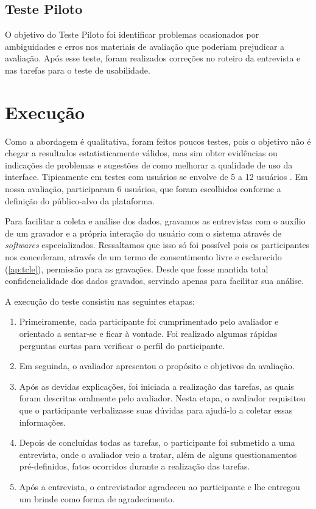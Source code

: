 \subsection{Teste Piloto}

O objetivo do Teste Piloto foi identificar problemas ocasionados por ambiguidades e erros nos materiais de avaliação que poderiam prejudicar a avaliação. Após esse teste, foram realizados correções no roteiro da entrevista e nas tarefas para o teste de usabilidade.

\section{Execução}

Como a abordagem é qualitativa, foram feitos poucos testes, pois o objetivo não é chegar a resultados estatisticamente válidos, mas sim obter evidências ou indicações de problemas e sugestões de como melhorar a qualidade de uso da interface. Tipicamente em testes com usuários se envolve de 5 a 12 usuários \cite{dumas1999practical}. Em nossa avaliação, participaram 6 usuários, que foram escolhidos conforme a definição do público-alvo da plataforma.

Para facilitar a coleta e análise dos dados, gravamos as entrevistas com o auxílio de um gravador e a própria interação do usuário com o sistema através de \textit{softwares} especializados. Ressaltamos que isso só foi possível pois os participantes nos concederam, através de um termo de consentimento livre e esclarecido (\autoref{ap:tcle}), permissão para as gravações. Desde que fosse mantida total confidencialidade dos dados gravados, servindo apenas para facilitar sua análise.

A execução do teste consistiu nas seguintes etapas:
\begin{enumerate}
	\item Primeiramente, cada participante foi cumprimentado pelo avaliador e orientado a sentar-se e ficar à vontade. Foi realizado algumas rápidas perguntas curtas para verificar o perfil do participante.
	\item Em seguinda, o avaliador apresentou o propósito e objetivos da avaliação.   
	\item Após as devidas explicações, foi iniciada a realização das tarefas, as quais foram descritas oralmente pelo avaliador. Nesta etapa, o avaliador requisitou que o participante verbalizasse suas dúvidas para ajudá-lo a coletar essas informações.
	\item Depois de concluídas todas as tarefas, o participante foi submetido a uma entrevista, onde o avaliador veio a tratar, além de alguns questionamentos pré-definidos, fatos ocorridos durante a realização das tarefas.
	\item Após a entrevista, o entrevistador agradeceu ao participante e lhe entregou um brinde como forma de agradecimento.  
\end{enumerate}

